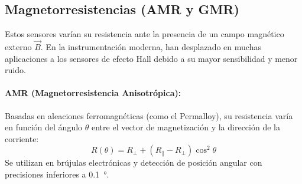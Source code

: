 \begin{marginfigure}
    \centering
    \shorthandoff{>}
    \caption[Rspuesta log-log de una fotorresistencia.]{Respuesta log-log de una fotorresistencia. La linealidad en esta escala permite procesar la señal mediante amplificadores logarítmicos o algoritmos de potencia.}\label{fig:ldr_log}
\end{marginfigure}


\subsection{Magnetorresistencias (AMR y GMR)}

Estos sensores varían su resistencia ante la presencia de un campo magnético externo $\vec{B}$. En la instrumentación moderna, han desplazado en muchas aplicaciones a los sensores de efecto Hall debido a su mayor sensibilidad y menor ruido.

\paragraph{AMR (Magnetorresistencia Anisotrópica):}
Basadas en aleaciones ferromagnéticas (como el Permalloy), su resistencia varía en función del ángulo $\theta$ entre el vector de magnetización y la dirección de la corriente:
\begin{equation}
    R(\theta) = R_{\perp} + (R_{\parallel} - R_{\perp}) \cos^2 \theta
\end{equation}
Se utilizan en brújulas electrónicas y detección de posición angular con precisiones inferiores a \qty{0,1}{\degree}.

